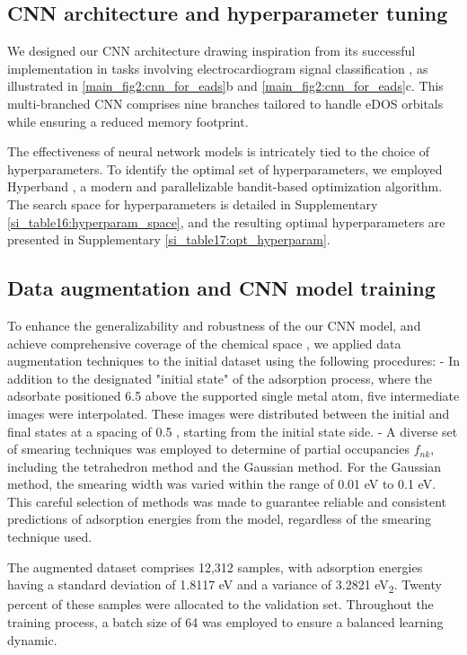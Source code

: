\subsection{CNN architecture and hyperparameter tuning}
We designed our CNN architecture drawing inspiration from its successful implementation in tasks involving electrocardiogram signal classification \cite{weimann2021transfer}, as illustrated in \cref{main_fig2:cnn_for_eads}b and \cref{main_fig2:cnn_for_eads}c.
This multi-branched CNN comprises nine branches tailored to handle eDOS orbitals while ensuring a reduced memory footprint.

The effectiveness of neural network models is intricately tied to the choice of hyperparameters.
To identify the optimal set of hyperparameters, we employed Hyperband \cite{li2018hyperband}, a modern and parallelizable bandit-based optimization algorithm.
The search space for hyperparameters is detailed in Supplementary \cref{si_table16:hyperparam_space}, and the resulting optimal hyperparameters are presented in Supplementary \cref{si_table17:opt_hyperparam}.


\subsection{Data augmentation and CNN model training}
To enhance the generalizability and robustness of the our CNN model, and achieve comprehensive coverage of the chemical space \cite{DBLP:journals/corr/abs-2112-12542}, we applied data augmentation techniques to the initial dataset using the following procedures:
	- In addition to the designated "initial state" of the adsorption process, where the adsorbate positioned 6.5 \text{\AA} above the supported single metal atom, five intermediate images were interpolated. These images were distributed between the initial and final states at a spacing of 0.5 \text{\AA}, starting from the initial state side.
	- A diverse set of smearing techniques was employed to determine of partial occupancies $f_{nk}$, including the tetrahedron method \cite{blochl1994improved} and the Gaussian method. For the Gaussian method, the smearing width was varied within the range of 0.01 eV to 0.1 eV. This careful selection of methods was made to guarantee reliable and consistent predictions of adsorption energies from the model, regardless of the smearing technique used.

The augmented dataset comprises 12,312 samples, with adsorption energies having a standard deviation of 1.8117 eV and a variance of 3.2821 eV\textsubscript{2}.
Twenty percent of these samples were allocated to the validation set. Throughout the training process, a batch size of 64 was employed to ensure a balanced learning dynamic.


